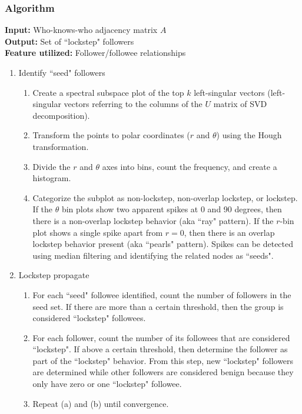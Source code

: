 \documentclass[11pt, oneside]{article}   	%
\begin{document}
\subsubsection*{Algorithm}

\textbf{Input:} Who-knows-who adjacency matrix $A$\\
\textbf{Output:} Set of ``lockstep" followers\\
\textbf{Feature utilized:} Follower/followee relationships

\begin{enumerate}
	\item Identify ``seed" followers
	\begin{enumerate}
		\item Create a spectral subspace plot of the top $k$ left-singular vectors (left-singular vectors referring to the columns of the $U$ matrix of SVD decomposition).
		\item Transform the points to polar coordinates ($r$ and $\theta$) using the Hough transformation.
		\item Divide the $r$ and $\theta$ axes into bins, count the frequency, and create a histogram.
		\item Categorize the subplot as non-lockstep, non-overlap lockstep, or lockstep.
		If the $\theta$ bin plots show two apparent spikes at 0 and 90 degrees, then there is a non-overlap lockstep behavior (aka ``ray" pattern).
		If the $r$-bin plot shows a single spike apart from $r = 0$, then there is an overlap lockstep behavior present (aka ``pearls" pattern).
		Spikes can be detected using median filtering and identifying the related nodes as ``seeds".
	\end{enumerate}
	\item Lockstep propagate
	\begin{enumerate}
		\item For each ``seed" followee identified, count the number of followers in the seed set.
		If there are more than a certain threshold, then the group is considered ``lockstep" followees.
		\item For each follower, count the number of its followees that are considered ``lockstep".
		If above a certain threshold, then determine the follower as part of the ``lockstep" behavior.
		From this step, new ``lockstep" followers are determined while other followers are considered benign because they only have zero or one ``lockstep" followee.
		\item Repeat (a) and (b) until convergence.
	\end{enumerate}
\end{enumerate}
\end{document}
